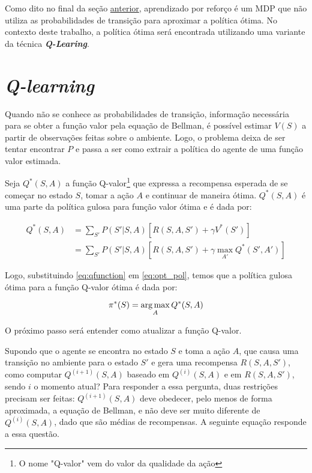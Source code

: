 Como dito no final da seção \hyperref[sec:mdp]{anterior}, aprendizado por reforço é um MDP que não utiliza as probabilidades de transição para aproximar a política ótima.
No contexto deste trabalho, a política ótima será encontrada utilizando uma variante da técnica \textit{\textbf{Q-Learing}}.


\section{\textit{Q-learning}}
\label{sec:ql}

Quando não se conhece as probabilidades de transição, informação necessária para se obter a função valor pela equação de Bellman, é possível estimar $V(S)$ a partir de observações feitas sobre o ambiente.
Logo, o problema deixa de ser tentar encontrar $P$ e passa a ser como extrair a política do agente de uma função valor estimada.

Seja $Q^{*}(S,A)$ a função Q-valor\footnote{O nome "Q-valor"{} vem do valor da qualidade da ação} que expressa a recompensa esperada de se começar no estado $S$, tomar a ação $A$ e continuar de maneira ótima. $Q^{*}(S,A)$ é uma parte da política gulosa para função valor ótima e é dada por:

\begin{equation} \label{eq:qfunction}
\begin{align*}
Q^{*}(S,A) &= \sum_{S'}P(S'|S,A)[R(S,A,S') + \gamma V^{*}(S')] \\
        &= \sum_{S'}P(S'|S,A)[R(S,A,S') + \gamma \max_{A'}Q^{*}(S',A')]
\end{align*}
\end{equation}

Logo, substituindo \ref{eq:qfunction} em \ref{eq:opt_pol}, temos que a política gulosa ótima para a função Q-valor ótima é dada por:

\begin{equation} \label{eq:q_opt_pol}
\pi^{*}(S) = \operatorname*{arg\,max}_{A}Q^{*}(S,A)
\end{equation}

O próximo passo será entender como atualizar a função Q-valor.

Supondo que o agente se encontra no estado $S$ e toma a ação $A$, que causa uma transição no ambiente para o estado $S'$ e gera uma recompensa $R(S,A,S')$, como computar $Q^{(i+1)}(S,A)$ baseado em $Q^{(i)}(S,A)$ e em $R(S,A,S')$, sendo $i$ o momento atual?
Para responder a essa pergunta, duas restrições precisam ser feitas: $Q^{(i+1)}(S,A)$ deve obedecer, pelo menos de forma aproximada, a equação de Bellman, e não deve ser muito diferente de $Q^{(i)}(S,A)$, dado que são médias de recompensas.
A seguinte equação responde a essa questão.

